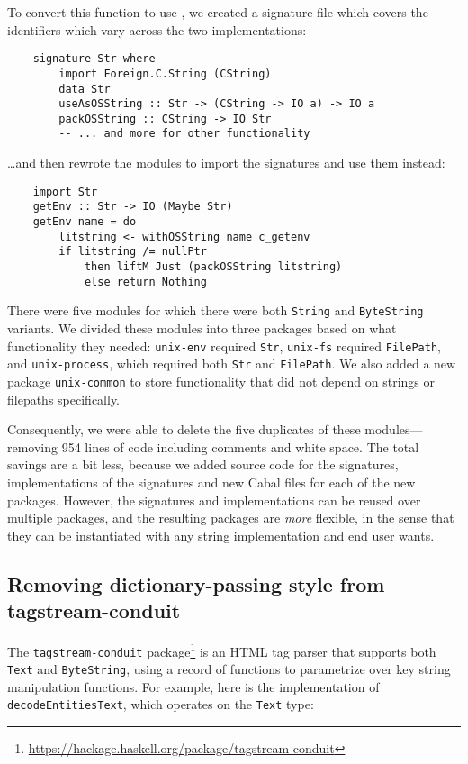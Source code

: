To convert this function to use \Backpack{}, we created
a signature file which covers the identifiers which vary across the
two implementations:

\begin{lstlisting}
    signature Str where
        import Foreign.C.String (CString)
        data Str
        useAsOSString :: Str -> (CString -> IO a) -> IO a
        packOSString :: CString -> IO Str
        -- ... and more for other functionality
\end{lstlisting}
%
\ldots{}and then rewrote the modules to import the signatures and use
them instead:

\begin{lstlisting}
    import Str
    getEnv :: Str -> IO (Maybe Str)
    getEnv name = do
        litstring <- withOSString name c_getenv
        if litstring /= nullPtr
            then liftM Just (packOSString litstring)
            else return Nothing
\end{lstlisting}
%
There were five modules for which there were both \verb|String| and
\verb|ByteString| variants. We divided these modules into three packages based
on what functionality they needed:  \verb|unix-env| required \verb|Str|,
\verb|unix-fs| required \verb|FilePath|, and \verb|unix-process|, which
required both \verb|Str| and \verb|FilePath|.  We also added a new
package \verb|unix-common| to store functionality that did not depend
on strings or filepaths specifically.

Consequently, we were able to delete the five duplicates of these
modules---removing 954 lines of code including comments and white space.
The total savings are a bit less, because we added source code for the
signatures, implementations of the signatures and new Cabal files for
each of the new packages.  However, the signatures and implementations
can be reused over multiple packages, and the resulting packages are
\emph{more} flexible, in the sense that they can be instantiated with
any string implementation and end user wants.

\subsection{Removing dictionary-passing style from tagstream-conduit}

The \texttt{tagstream-conduit}
package\footnote{\smaller\url{https://hackage.haskell.org/package/tagstream-conduit}}
is an HTML tag parser that supports both \verb|Text| and
\verb|ByteString|, using a record of functions to parametrize over key
string manipulation functions.  For example, here is the implementation
of \verb|decodeEntitiesText|, which operates on the \verb|Text| type:

